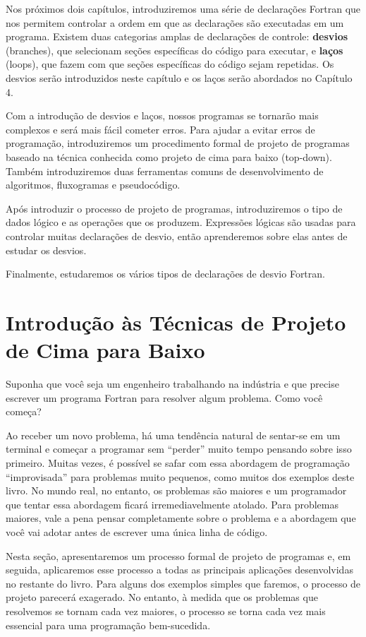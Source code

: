 \documentclass[11pt,a4paper]{book}
\begin{document}
	Nos próximos dois capítulos, introduziremos uma série de declarações Fortran que nos permitem controlar a ordem em que as declarações são executadas em um programa. Existem duas categorias amplas de declarações de controle: \textbf{desvios} (branches), que selecionam seções específicas do código para executar, e \textbf{laços} (loops), que fazem com que seções específicas do código sejam repetidas. Os desvios serão introduzidos neste capítulo e os laços serão abordados no Capítulo 4.
	
	Com a introdução de desvios e laços, nossos programas se tornarão mais complexos e será mais fácil cometer erros. Para ajudar a evitar erros de programação, introduziremos um procedimento formal de projeto de programas baseado na técnica conhecida como projeto de cima para baixo (top-down). Também introduziremos duas ferramentas comuns de desenvolvimento de algoritmos, fluxogramas e pseudocódigo.
	
	Após introduzir o processo de projeto de programas, introduziremos o tipo de dados lógico e as operações que os produzem. Expressões lógicas são usadas para controlar muitas declarações de desvio, então aprenderemos sobre elas antes de estudar os desvios.
	
	Finalmente, estudaremos os vários tipos de declarações de desvio Fortran.
	
	\section{Introdução às Técnicas de Projeto de Cima para Baixo}
	
	Suponha que você seja um engenheiro trabalhando na indústria e que precise escrever um programa Fortran para resolver algum problema. Como você começa?
	
	Ao receber um novo problema, há uma tendência natural de sentar-se em um terminal e começar a programar sem ``perder'' muito tempo pensando sobre isso primeiro. Muitas vezes, é possível se safar com essa abordagem de programação ``improvisada'' para problemas muito pequenos, como muitos dos exemplos deste livro. No mundo real, no entanto, os problemas são maiores e um programador que tentar essa abordagem ficará irremediavelmente atolado. Para problemas maiores, vale a pena pensar completamente sobre o problema e a abordagem que você vai adotar antes de escrever uma única linha de código.
	
	Nesta seção, apresentaremos um processo formal de projeto de programas e, em seguida, aplicaremos esse processo a todas as principais aplicações desenvolvidas no restante do livro. Para alguns dos exemplos simples que faremos, o processo de projeto parecerá exagerado. No entanto, à medida que os problemas que resolvemos se tornam cada vez maiores, o processo se torna cada vez mais essencial para uma programação bem-sucedida.
	
\end{document}
